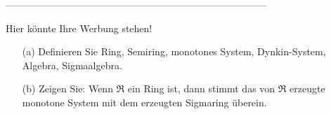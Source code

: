 --------------------------------------------------------------------------------

\begin{exercise}

Hier könnte Ihre Werbung stehen!

\begin{itemize}
  \item[(a)] Definieren Sie Ring, Semiring, monotones System, Dynkin-System, Algebra, Sigmaalgebra.
  \item[(b)] Zeigen Sie: Wenn $\mathfrak{R}$ ein Ring ist, dann stimmt das von $\mathfrak{R}$ erzeugte monotone System mit dem erzeugten Sigmaring überein.
\end{itemize}

\end{exercise}

